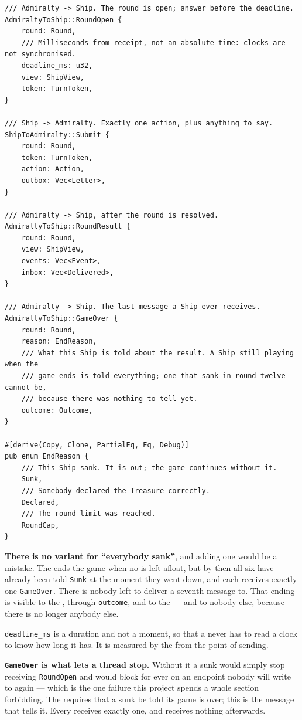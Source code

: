 \documentclass{article}
\begin{document}
\begin{lstlisting}
/// Admiralty -> Ship. The round is open; answer before the deadline.
AdmiraltyToShip::RoundOpen {
    round: Round,
    /// Milliseconds from receipt, not an absolute time: clocks are not synchronised.
    deadline_ms: u32,
    view: ShipView,
    token: TurnToken,
}

/// Ship -> Admiralty. Exactly one action, plus anything to say.
ShipToAdmiralty::Submit {
    round: Round,
    token: TurnToken,
    action: Action,
    outbox: Vec<Letter>,
}

/// Admiralty -> Ship, after the round is resolved.
AdmiraltyToShip::RoundResult {
    round: Round,
    view: ShipView,
    events: Vec<Event>,
    inbox: Vec<Delivered>,
}

/// Admiralty -> Ship. The last message a Ship ever receives.
AdmiraltyToShip::GameOver {
    round: Round,
    reason: EndReason,
    /// What this Ship is told about the result. A Ship still playing when the
    /// game ends is told everything; one that sank in round twelve cannot be,
    /// because there was nothing to tell yet.
    outcome: Outcome,
}

#[derive(Copy, Clone, PartialEq, Eq, Debug)]
pub enum EndReason {
    /// This Ship sank. It is out; the game continues without it.
    Sunk,
    /// Somebody declared the Treasure correctly.
    Declared,
    /// The round limit was reached.
    RoundCap,
}
\end{lstlisting}

\textbf{There is no variant for ``everybody sank''}, and adding one would be a mistake. The \MD{}
ends the game when no \ship{} is left afloat, but by then all six have already been told
\texttt{Sunk} at the moment they went down, and each receives exactly one \texttt{GameOver}. There
is nobody left to deliver a seventh message to. That ending is visible to the \chart{}, through
\texttt{outcome}, and to the \cartographer{} --- and to nobody else, because there is no longer
anybody else.

\texttt{deadline\_ms} is a duration and not a moment, so that a \ship{} never has to read a clock
to know how long it has. It is measured by the \admiralty{} from the point of sending.

\textbf{\texttt{GameOver} is what lets a \ship{} thread stop.} Without it a sunk \ship{} would
simply stop receiving \texttt{RoundOpen} and would block for ever on an endpoint nobody will
write to again --- which is the one failure this project spends a whole section forbidding. The
\MD{} requires that a sunk \ship{} be told its game is over; this is the message that tells it.
Every \ship{} receives exactly one, and receives nothing afterwards.
\end{document}
